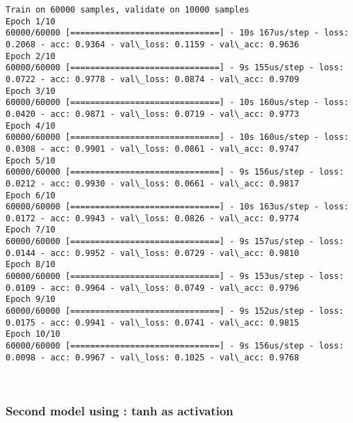 \documentclass[11pt]{article}
\begin{document}
    \begin{Verbatim}[commandchars=\\\{\}]
Train on 60000 samples, validate on 10000 samples
Epoch 1/10
60000/60000 [==============================] - 10s 167us/step - loss: 0.2068 - acc: 0.9364 - val\_loss: 0.1159 - val\_acc: 0.9636
Epoch 2/10
60000/60000 [==============================] - 9s 155us/step - loss: 0.0722 - acc: 0.9778 - val\_loss: 0.0874 - val\_acc: 0.9709
Epoch 3/10
60000/60000 [==============================] - 10s 160us/step - loss: 0.0420 - acc: 0.9871 - val\_loss: 0.0719 - val\_acc: 0.9773
Epoch 4/10
60000/60000 [==============================] - 10s 160us/step - loss: 0.0308 - acc: 0.9901 - val\_loss: 0.0861 - val\_acc: 0.9747
Epoch 5/10
60000/60000 [==============================] - 9s 156us/step - loss: 0.0212 - acc: 0.9930 - val\_loss: 0.0661 - val\_acc: 0.9817
Epoch 6/10
60000/60000 [==============================] - 10s 163us/step - loss: 0.0172 - acc: 0.9943 - val\_loss: 0.0826 - val\_acc: 0.9774
Epoch 7/10
60000/60000 [==============================] - 9s 157us/step - loss: 0.0144 - acc: 0.9952 - val\_loss: 0.0729 - val\_acc: 0.9810
Epoch 8/10
60000/60000 [==============================] - 9s 153us/step - loss: 0.0109 - acc: 0.9964 - val\_loss: 0.0749 - val\_acc: 0.9796
Epoch 9/10
60000/60000 [==============================] - 9s 152us/step - loss: 0.0175 - acc: 0.9941 - val\_loss: 0.0741 - val\_acc: 0.9815
Epoch 10/10
60000/60000 [==============================] - 9s 156us/step - loss: 0.0098 - acc: 0.9967 - val\_loss: 0.1025 - val\_acc: 0.9768

    \end{Verbatim}

    \begin{center}
    \end{center}
    { \hspace*{\fill} \\}
    
    \subsubsection{Second model using : tanh as
activation}\label{second-model-using-tanh-as-activation}
\end{document}

